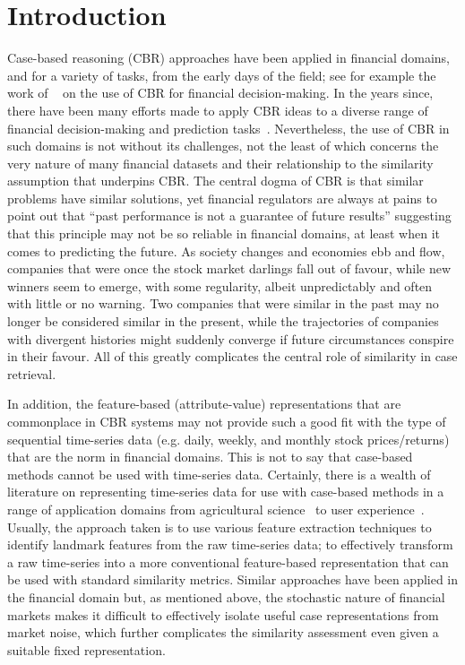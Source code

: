 \documentclass[runningheads]{llncs}
\begin{document}
\section{Introduction}
Case-based reasoning (CBR) approaches have been applied in financial domains, and for a variety of tasks, from the early days of the field; see for example the work of ~\cite{slade1991case} on the use of CBR for financial decision-making. In the years since, there have been many efforts made to apply CBR ideas to a diverse range of financial decision-making and prediction tasks~\cite{kim2004toward,oh2007financial,li2009predicting,wang2016case,chun2020geometric,dolphin2021measuring}. Nevertheless, the use of CBR in such domains is not without its challenges, not the least of which concerns the very nature of many financial datasets and their relationship to the similarity assumption that underpins CBR. The central dogma of CBR is that similar problems have similar solutions, yet financial regulators are always at pains to point out that ``past performance is not a guarantee of future results'' suggesting that this principle may not be so reliable in financial domains, at least when it comes to predicting the future. As society changes and economies ebb and flow, companies that were once the stock market darlings fall out of favour, while new winners seem to emerge, with some regularity, albeit unpredictably and often with little or no warning. Two companies that were similar in the past may no longer be considered similar in the present, while the trajectories of companies with divergent histories might suddenly converge if future circumstances conspire in their favour. All of this greatly complicates the central role of similarity in case retrieval. 

In addition, the feature-based (attribute-value) representations that are commonplace in CBR systems may not provide such a good fit with the type of sequential time-series data (e.g. daily, weekly, and monthly stock prices/returns) that are the norm in financial domains. This is not to say that case-based methods cannot be used with time-series data. Certainly, there is a wealth of literature on representing time-series data for use with case-based methods in a range of application domains from agricultural science~\cite{delaney2022forecasting} to user experience~\cite{lora2017time}. Usually, the approach taken is to use various feature extraction techniques to identify landmark features from the raw time-series data; to effectively transform a raw time-series into a more conventional feature-based representation that can be used with standard similarity metrics. Similar approaches have been applied in the financial domain \cite{kumar2020technical} but, as mentioned above, the stochastic nature of financial markets makes it difficult to effectively isolate useful case representations from market noise, which further complicates the similarity assessment even given a suitable fixed representation.
\end{document}
